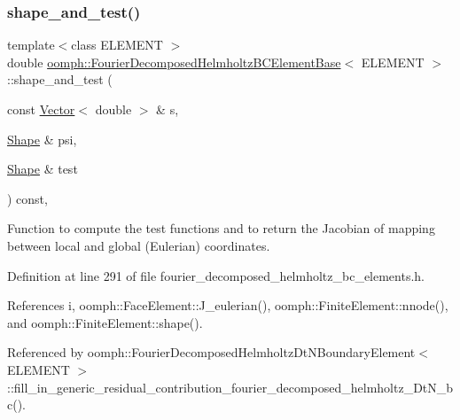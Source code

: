 \subsubsection{\texorpdfstring{shape\+\_\+and\+\_\+test()}{shape\_and\_test()}}
{\footnotesize\ttfamily template$<$class E\+L\+E\+M\+E\+NT $>$ \\
double \hyperlink{classoomph_1_1FourierDecomposedHelmholtzBCElementBase}{oomph\+::\+Fourier\+Decomposed\+Helmholtz\+B\+C\+Element\+Base}$<$ E\+L\+E\+M\+E\+NT $>$\+::shape\+\_\+and\+\_\+test (\begin{DoxyParamCaption}\item[{const \hyperlink{classoomph_1_1Vector}{Vector}$<$ double $>$ \&}]{s,  }\item[{\hyperlink{classoomph_1_1Shape}{Shape} \&}]{psi,  }\item[{\hyperlink{classoomph_1_1Shape}{Shape} \&}]{test }\end{DoxyParamCaption}) const\hspace{0.3cm}{\ttfamily [inline]}, {\ttfamily [protected]}}



Function to compute the test functions and to return the Jacobian of mapping between local and global (Eulerian) coordinates. 



Definition at line 291 of file fourier\+\_\+decomposed\+\_\+helmholtz\+\_\+bc\+\_\+elements.\+h.



References i, oomph\+::\+Face\+Element\+::\+J\+\_\+eulerian(), oomph\+::\+Finite\+Element\+::nnode(), and oomph\+::\+Finite\+Element\+::shape().



Referenced by oomph\+::\+Fourier\+Decomposed\+Helmholtz\+Dt\+N\+Boundary\+Element$<$ E\+L\+E\+M\+E\+N\+T $>$\+::fill\+\_\+in\+\_\+generic\+\_\+residual\+\_\+contribution\+\_\+fourier\+\_\+decomposed\+\_\+helmholtz\+\_\+\+Dt\+N\+\_\+bc().

\mbox{\label{classoomph_1_1FourierDecomposedHelmholtzBCElementBase_ae3b5e32d07a1dc898fec269470cf2000}} 

